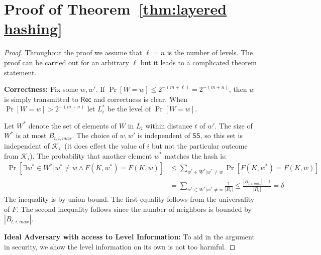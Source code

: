 \documentclass[11pt]{article}
\newcommand{\thref}[1]{\mbox{Theorem~\ref{#1}}}
\newcommand{\class}[1]{{\ensuremath{\mathsf{#1}}}}
\newcommand{\sketch}{\ensuremath{\class{SS}}\xspace}
\newcommand{\rec}{\ensuremath{\class{Rec}}\xspace}
\begin{document}
\section{Proof of \thref{thm:layered hashing}}
\label{sec:proof of layered hashing}
\begin{proof}
Throughout the proof we assume that $\ell = n$ is the number of levels.  The proof can be carried out for an arbitrary $\ell$ but it leads to a complicated theorem statement.

\noindent
\textbf{Correctness:}  Fix some $w, w'$.  If $\Pr[W=w]\le 2^{-(m+\ell)} = 2^{-(m+n)}$, then $w$ is simply transmitted to $\rec$ and correctness is clear.  When $\Pr[W=w]> 2^{-(m+n)}$ let $L_i^*$ be the level of $\Pr[W=w]$.

Let $W^*$ denote the set of elements of $W$ in $L_i$ within distance $t$ of $w'$.  The size of $W^*$ is at most $B_{t, i, max}$. The choice of $w, w'$ is independent of $\sketch$, so this set is independent of $\mathcal{K}_i$~(it does effect the value of $i$ but not the particular outcome from $\mathcal{K}_i$).  The probability that another element $w^*$ matches the hash is:
\begin{align*}
\Pr[\exists w^* \in W^* |w^* \neq w \wedge F(K, w^*) = F(K, w)] &\le \sum_{w^*\in W^* | w^*\neq w} \Pr[F(K, w^*) = F(K, w)] \\
 &= \sum_{w^*\in W^* | w^*\neq w} \frac{1}{|R_i|} \le \frac{|B_{t, i, max}|-1}{|R_i|} = \delta
\end{align*}
The inequality is by union bound. The first equality follows from the universality of $F$.  The second inequality follows since the number of neighbors is bounded by $|B_{t, i, max}|$.  

\noindent
\textbf{Ideal Adversary with access to Level Information:} To aid in the argument in security, we show the level information on its own is not too harmful.


\end{proof}
\end{document}
